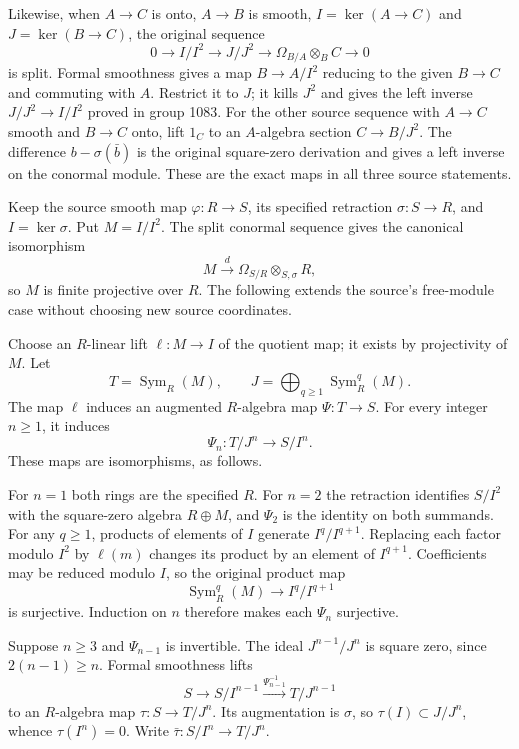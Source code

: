 Likewise, when \(A\to C\) is onto, \(A\to B\) is smooth, \(I=\ker(A\to C)\) and \(J=\ker(B\to C)\), the original sequence \[
0\longrightarrow I/I^2\longrightarrow J/J^2
\longrightarrow\Omega_{B/A}\otimes_B C\longrightarrow0
\] is split. Formal smoothness gives a map \(B\to A/I^2\) reducing to the given \(B\to C\) and commuting with \(A\). Restrict it to \(J\); it kills \(J^2\) and gives the left inverse \(J/J^2\to I/I^2\) proved in group 1083. For the other source sequence with \(A\to C\) smooth and \(B\to C\) onto, lift \(1_C\) to an \(A\)-algebra section \(C\to B/J^2\). The difference \(b-\sigma(\bar b)\) is the original square-zero derivation and gives a left inverse on the conormal module. These are the exact maps in all three source statements.

Keep the source smooth map \(\varphi:R\to S\), its specified retraction \(\sigma:S\to R\), and \(I=\ker\sigma\). Put \(M=I/I^2\). The split conormal sequence gives the canonical isomorphism \[
M\xrightarrow{\ d\ }\Omega_{S/R}\otimes_{S,\sigma}R,
\] so \(M\) is finite projective over \(R\). The following extends the source's free-module case without choosing new source coordinates.

Choose an \(R\)-linear lift \(\ell:M\to I\) of the quotient map; it exists by projectivity of \(M\). Let \[
T=\operatorname{Sym}_R(M),\qquad J=\bigoplus_{q\ge1}\operatorname{Sym}_R^q(M).
\] The map \(\ell\) induces an augmented \(R\)-algebra map \(\Psi:T\to S\). For every integer \(n\ge1\), it induces \[
\Psi_n:T/J^n\longrightarrow S/I^n.
\] These maps are isomorphisms, as follows.

For \(n=1\) both rings are the specified \(R\). For \(n=2\) the retraction identifies \(S/I^2\) with the square-zero algebra \(R\oplus M\), and \(\Psi_2\) is the identity on both summands. For any \(q\ge1\), products of elements of \(I\) generate \(I^q/I^{q+1}\). Replacing each factor modulo \(I^2\) by \(\ell(m)\) changes its product by an element of \(I^{q+1}\). Coefficients may be reduced modulo \(I\), so the original product map \[
\operatorname{Sym}_R^q(M)\longrightarrow I^q/I^{q+1}
\] is surjective. Induction on \(n\) therefore makes each \(\Psi_n\) surjective.

Suppose \(n\ge3\) and \(\Psi_{n-1}\) is invertible. The ideal \(J^{n-1}/J^n\) is square zero, since \(2(n-1)\ge n\). Formal smoothness lifts \[
S\longrightarrow S/I^{n-1}\xrightarrow{\Psi_{n-1}^{-1}}T/J^{n-1}
\] to an \(R\)-algebra map \(\tau:S\to T/J^n\). Its augmentation is \(\sigma\), so \(\tau(I)\subset J/J^n\), whence \(\tau(I^n)=0\). Write \(\bar\tau:S/I^n\to T/J^n\).

